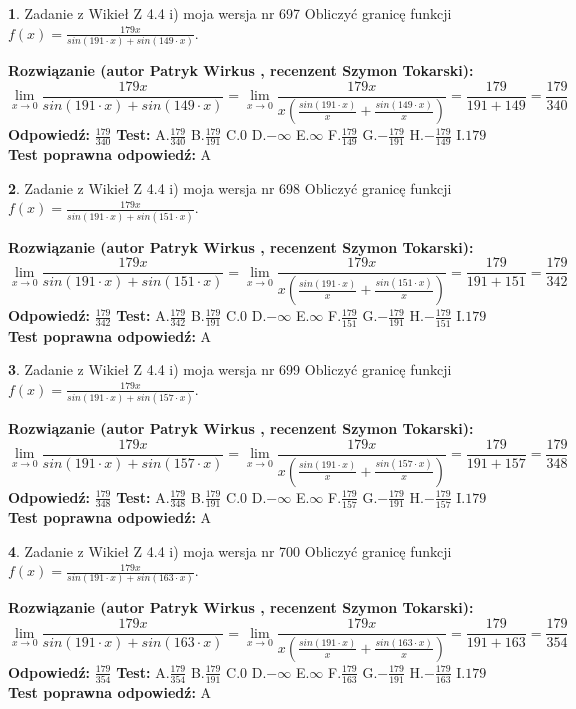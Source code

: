 \documentclass[12pt, a4paper]{article}
\theoremstyle{definition} %
\newtheorem{zad}{}
\newcommand{\zadStart}[1]{\begin{zad}#1\newline}
\newcommand{\zadStop}{\end{zad}}
\newcommand{\rozwStart}[2]{\noindent \textbf{Rozwiązanie (autor #1 , recenzent #2): }\newline}
\newcommand{\rozwStop}{\newline}
\newcommand{\odpStart}{\noindent \textbf{Odpowiedź:}\newline}
\newcommand{\odpStop}{\newline}
\newcommand{\testStart}{\noindent \textbf{Test:}\newline}
\newcommand{\testStop}{\newline}
\newcommand{\kluczStart}{\noindent \textbf{Test poprawna odpowiedź:}\newline}
\newcommand{\kluczStop}{\newline}
\begin{document}
\zadStart{Zadanie z Wikieł Z 4.4 i) moja wersja nr 697}
Obliczyć granicę funkcji $f(x)=\frac{179x}{sin(191\cdot x) +sin(149\cdot x)}$.
\zadStop
\rozwStart{Patryk Wirkus}{Szymon Tokarski}
$$\lim\limits_{x\to 0}\frac{179x}{sin(191\cdot x) +sin(149\cdot x)}=\lim\limits_{x\to 0}\frac{179x}{x(\frac{sin(191\cdot x)}{x}+\frac{sin(149\cdot x)}{x})}=\frac{179}{191+149} = \frac{179}{340}$$
\rozwStop
\odpStart
$\frac{179}{340}$
\odpStop
\testStart
A.$\frac{179}{340}$
B.$\frac{179}{191}$
C.$0$
D.$-\infty$
E.$\infty$
F.$\frac{179}{149}$
G.$-\frac{179}{191}$
H.$-\frac{179}{149}$
I.$179$
\testStop
\kluczStart
A
\kluczStop



\zadStart{Zadanie z Wikieł Z 4.4 i) moja wersja nr 698}
Obliczyć granicę funkcji $f(x)=\frac{179x}{sin(191\cdot x) +sin(151\cdot x)}$.
\zadStop
\rozwStart{Patryk Wirkus}{Szymon Tokarski}
$$\lim\limits_{x\to 0}\frac{179x}{sin(191\cdot x) +sin(151\cdot x)}=\lim\limits_{x\to 0}\frac{179x}{x(\frac{sin(191\cdot x)}{x}+\frac{sin(151\cdot x)}{x})}=\frac{179}{191+151} = \frac{179}{342}$$
\rozwStop
\odpStart
$\frac{179}{342}$
\odpStop
\testStart
A.$\frac{179}{342}$
B.$\frac{179}{191}$
C.$0$
D.$-\infty$
E.$\infty$
F.$\frac{179}{151}$
G.$-\frac{179}{191}$
H.$-\frac{179}{151}$
I.$179$
\testStop
\kluczStart
A
\kluczStop



\zadStart{Zadanie z Wikieł Z 4.4 i) moja wersja nr 699}
Obliczyć granicę funkcji $f(x)=\frac{179x}{sin(191\cdot x) +sin(157\cdot x)}$.
\zadStop
\rozwStart{Patryk Wirkus}{Szymon Tokarski}
$$\lim\limits_{x\to 0}\frac{179x}{sin(191\cdot x) +sin(157\cdot x)}=\lim\limits_{x\to 0}\frac{179x}{x(\frac{sin(191\cdot x)}{x}+\frac{sin(157\cdot x)}{x})}=\frac{179}{191+157} = \frac{179}{348}$$
\rozwStop
\odpStart
$\frac{179}{348}$
\odpStop
\testStart
A.$\frac{179}{348}$
B.$\frac{179}{191}$
C.$0$
D.$-\infty$
E.$\infty$
F.$\frac{179}{157}$
G.$-\frac{179}{191}$
H.$-\frac{179}{157}$
I.$179$
\testStop
\kluczStart
A
\kluczStop



\zadStart{Zadanie z Wikieł Z 4.4 i) moja wersja nr 700}
Obliczyć granicę funkcji $f(x)=\frac{179x}{sin(191\cdot x) +sin(163\cdot x)}$.
\zadStop
\rozwStart{Patryk Wirkus}{Szymon Tokarski}
$$\lim\limits_{x\to 0}\frac{179x}{sin(191\cdot x) +sin(163\cdot x)}=\lim\limits_{x\to 0}\frac{179x}{x(\frac{sin(191\cdot x)}{x}+\frac{sin(163\cdot x)}{x})}=\frac{179}{191+163} = \frac{179}{354}$$
\rozwStop
\odpStart
$\frac{179}{354}$
\odpStop
\testStart
A.$\frac{179}{354}$
B.$\frac{179}{191}$
C.$0$
D.$-\infty$
E.$\infty$
F.$\frac{179}{163}$
G.$-\frac{179}{191}$
H.$-\frac{179}{163}$
I.$179$
\testStop
\kluczStart
A
\kluczStop
\end{document}
